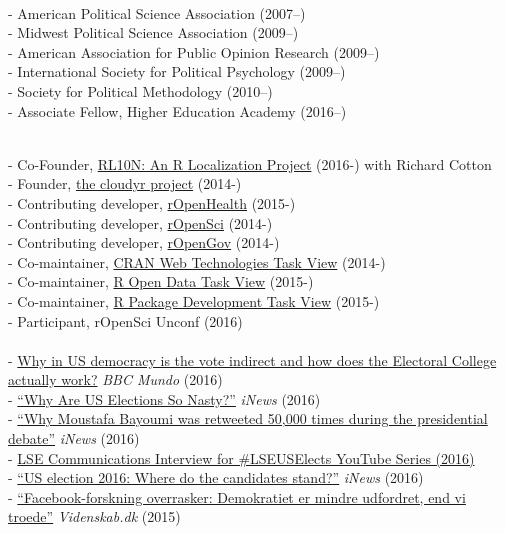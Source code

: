 \documentclass[12pt]{article}
\renewcommand{\section}[1]{\pagebreak[3]%
    \llap{\scshape\smash{\parbox[t]{\marginparwidth}{\raggedright {\color{lg}#1}}}}%
    \vspace{-\baselineskip}\par}
\newcommand{\topic}[1]{\pagebreak[3]\indent {\color{lg}{\footnotesize #1 }}\\}
\newcommand{\subentry}[1]{{\color{lg}-} #1\vspace{.25em}\\}
\begin{document}
\topic{Professional Memberships:}
		\subentry{American Political Science Association (2007--)}
		\subentry{Midwest Political Science Association (2009--)}
		\subentry{American Association for Public Opinion Research (2009--)}
		\subentry{International Society for Political Psychology (2009--)}
		\subentry{Society for Political Methodology (2010--)}
		\subentry{Associate Fellow, Higher Education Academy (2016--)}

\section{Public\\ Engagement}
	\topic{Open Science Evangelism}
		\subentry{Co-Founder, \href{http://rl10n.github.io/}{RL10N: An R Localization Project} (2016-) with Richard Cotton}
		\subentry{Founder, \href{http://cloudyr.github.io/}{the cloudyr project} (2014-)}
		\subentry{Contributing developer, \href{http://ropensci.org/}{rOpenHealth} (2015-)}
		\subentry{Contributing developer, \href{http://ropensci.org/}{rOpenSci} (2014-)}
		\subentry{Contributing developer, \href{http://ropengov.github.io/}{rOpenGov} (2014-)}
		\subentry{Co-maintainer, \href{http://cran.r-project.org/web/views/WebTechnologies.html}{CRAN Web Technologies Task View} (2014-)}
		\subentry{Co-maintainer, \href{https://www.github.com/ropensci/opendata}{R Open Data Task View} (2015-)}
		\subentry{Co-maintainer, \href{https://www.github.com/leeper/PackageDevelopment}{R Package Development Task View} (2015-)}
		\subentry{Participant, rOpenSci Unconf (2016)}
	
	\topic{Media Coverage and Interviews}
		\subentry{\href{http://www.bbc.com/mundo/noticias-internacional-37701880}{Why in US democracy is the vote indirect and how does the Electoral College actually work?} \textit{BBC Mundo} (2016)}
		\subentry{\href{https://inews.co.uk/essentials/news/world/us-elections-nasty/}{``Why Are US Elections So Nasty?''} \textit{iNews} (2016)}
		\subentry{\href{https://inews.co.uk/essentials/news/world/moustafa-bayoumi-retweeted-50000-presidential-debate/}{``Why Moustafa Bayoumi was retweeted 50,000 times during the presidential debate''} \textit{iNews} (2016)}
		\subentry{\href{https://www.youtube.com/watch?v=Hwm5V6H_qog&list=PLK4elntcUEy1a8P47lFQDg1oHoNq1BdYk&index=20}{LSE Communications Interview for \#LSEUSElects YouTube Series (2016)}}
		\subentry{\href{https://inews.co.uk/explainers/iq/candidates-stand-us-election-2016/}{``US election 2016: Where do the candidates stand?''} \textit{iNews} (2016)}
		\subentry{\href{http://videnskab.dk/kultur-samfund/facebook-forskning-overrasker-demokratiet-er-mindre-udfordret-end-vi-troede}{``Facebook-forskning overrasker: Demokratiet er mindre udfordret, end vi troede''} \textit{Videnskab.dk} (2015)}
	
\end{document}
